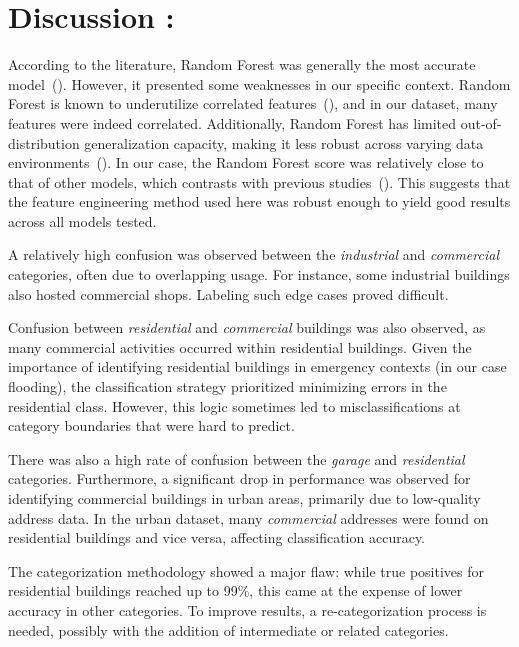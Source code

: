 \documentclass[11pt]{article}
\begin{document}
\section{Discussion :}

According to the literature, Random Forest was generally the most accurate model~(\cite{lloyd2020}).  However, it presented some weaknesses in our specific context. Random Forest is known to underutilize correlated features~(\cite{gregorutti2017correlation}), and in our dataset, many features were indeed correlated. Additionally, Random Forest has limited out-of-distribution generalization capacity, making it less robust across varying data environments~(\cite{rshimodaira2000covariate}).  In our case, the Random Forest score was relatively close to that of other models, which contrasts with previous studies~(\cite{lloyd2020}). This suggests that the feature engineering method used here was robust enough to yield good results across all models tested.





A relatively high confusion was observed between the \textit{industrial} and \textit{commercial} categories, often due to overlapping usage. For instance, some industrial buildings also hosted commercial shops. Labeling such edge cases proved difficult.

Confusion between \textit{residential} and \textit{commercial} buildings was also observed, as many commercial activities occurred within residential buildings. Given the importance of identifying residential buildings in emergency contexts (in our case flooding), the classification strategy prioritized minimizing errors in the residential class. However, this logic sometimes led to misclassifications at category boundaries that were hard to predict.

There was also a high rate of confusion between the \textit{garage} and \textit{residential} categories. Furthermore, a significant drop in performance was observed for identifying commercial buildings in urban areas, primarily due to low-quality address data. In the urban dataset, many \textit{commercial} addresses were found on residential buildings and vice versa, affecting classification accuracy.

The categorization methodology showed a major flaw: while true positives for residential buildings reached up to 99\%, this came at the expense of lower accuracy in other categories. To improve results, a re-categorization process is needed, possibly with the addition of intermediate or related categories.
\end{document}
